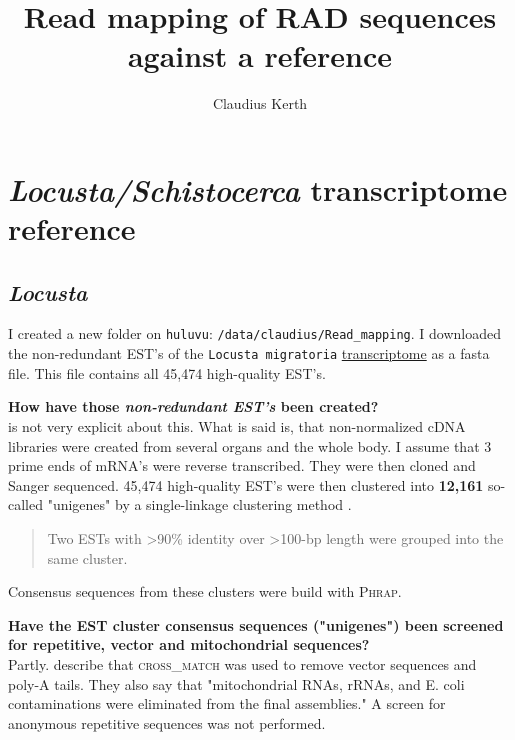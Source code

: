 \documentclass{article}\usepackage[]{graphicx}\usepackage[]{color}
\begin{document}


\title{Read mapping of RAD sequences against a reference}

\author{Claudius Kerth}

\maketitle


\tableofcontents


\section{\textit{Locusta/Schistocerca} transcriptome reference}

\subsection{\textit{Locusta}}
I created a new folder on \texttt{huluvu}: \texttt{/data/claudius/Read\_mapping}.
I downloaded the non-redundant EST's of the \texttt{Locusta migratoria} \href{http://locustdb.genomics.org.cn/jsp/download.jsp}{transcriptome} as a fasta file. This file contains all 45,474 high-quality EST's.

\textbf{How have those \emph{non-redundant EST's} been created?}\\
\citealt{Kang2004} is not very explicit about this. What is said is, that non-normalized cDNA libraries were created from several organs and the whole body. I assume that 3 prime ends of mRNA's were reverse transcribed. They were then cloned and Sanger sequenced. 45,474 high-quality EST's were then clustered into \textbf{12,161} so-called "unigenes" by a single-linkage clustering method \cite{Burke1999}. 
\begin{quote}
\textsf{
Two ESTs with >90\% identity over >100-bp length were grouped into the same cluster.
}
\end{quote}
Consensus sequences from these clusters were build with \textsc{Phrap}.

\textbf{Have the EST cluster consensus sequences ("unigenes") been screened for repetitive, vector and mitochondrial sequences?}\\
Partly. \citep{Ma2006} describe that \textsc{cross\_match} was used to remove vector sequences and poly-A tails. They also say that "mitochondrial RNAs, rRNAs, and E. coli contaminations were eliminated from the final assemblies." A screen for anonymous repetitive sequences was not performed.
\end{document}
